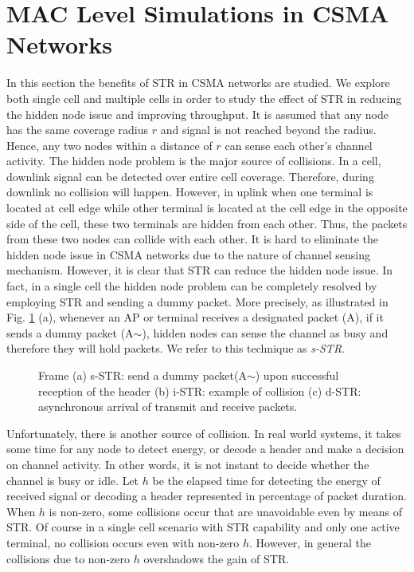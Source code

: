 \documentclass[twocolumn]{IEEEtran}
\begin{document}
\section{MAC Level Simulations in CSMA Networks}

In this section the benefits of STR in CSMA networks are studied. We
explore both single cell and multiple cells in order to study the
effect of STR in reducing the hidden node issue and improving
throughput. It is assumed that any node has the same coverage radius
$r$ and signal is not reached beyond the radius. Hence, any two
nodes within a distance of $r$ can sense each other's channel
activity. The hidden node problem is the major source of collisions.
In a cell, downlink signal can be detected over entire cell
coverage. Therefore, during downlink no collision will happen.
However, in uplink when one terminal is located at cell edge while
other terminal is located at the cell edge in the opposite side of
the cell, these two terminals are hidden from each other. Thus, the
packets from these two nodes can collide with each other. It is hard
to eliminate the hidden node issue in CSMA networks due to the
nature of channel sensing mechanism. However, it is clear that STR
can reduce the hidden node issue. In fact, in a single cell the
hidden node problem can be completely resolved by employing STR and
sending a dummy packet. More precisely, as illustrated in Fig.
\ref{frame} (a), whenever an AP or terminal receives a designated
packet (A), if it sends a dummy packet (A$\sim$), hidden nodes can
sense the channel as busy and therefore they will hold packets. We
refer to this technique as \textit{s-STR}.


\begin{figure}[!t]

\centering {}

\caption{Frame (a) s-STR: send a dummy packet(A$\sim$) upon
successful reception of the header (b) i-STR: example of collision
(c) d-STR: asynchronous arrival of transmit and receive packets.
\label{frame} }

\end{figure}

Unfortunately, there is another source of collision. In real world
systems, it takes some time for any node to detect energy, or decode
a header and make a decision on channel activity. In other words, it
is not instant to decide whether the channel is busy or idle. Let
$h$ be the elapsed time for detecting the energy of received signal
or decoding a header represented in percentage of packet duration.
When $h$ is non-zero, some collisions occur that are unavoidable
even by means of STR. Of course in a single cell scenario with STR
capability and only one active terminal, no collision occurs even
with non-zero $h$. However, in general the collisions due to
non-zero $h$ overshadows the gain of STR.
\end{document}
